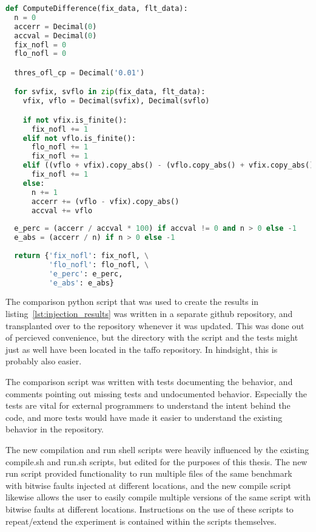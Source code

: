 \begin{lstlisting}[label=lst:validate_original,caption=Validate original,language=python]
def ComputeDifference(fix_data, flt_data):
  n = 0
  accerr = Decimal(0)
  accval = Decimal(0)
  fix_nofl = 0
  flo_nofl = 0

  thres_ofl_cp = Decimal('0.01')

  for svfix, svflo in zip(fix_data, flt_data):
    vfix, vflo = Decimal(svfix), Decimal(svflo)

    if not vfix.is_finite():
      fix_nofl += 1
    elif not vflo.is_finite():
      flo_nofl += 1
      fix_nofl += 1
    elif ((vflo + vfix).copy_abs() - (vflo.copy_abs() + vfix.copy_abs())) > thres_ofl_cp:
      fix_nofl += 1
    else:
      n += 1
      accerr += (vflo - vfix).copy_abs()
      accval += vflo
      
  e_perc = (accerr / accval * 100) if accval != 0 and n > 0 else -1
  e_abs = (accerr / n) if n > 0 else -1
      
  return {'fix_nofl': fix_nofl, \
          'flo_nofl': flo_nofl, \
          'e_perc': e_perc,
          'e_abs': e_abs}
\end{lstlisting}




The comparison python script that was used to create the results in listing~\ref{lst:injection_results} was written in a separate github repository, and transplanted over to the \taffo{} repository whenever it was updated. This was done out of percieved convenience, but the directory with the script and the tests might just as well have been located in the taffo repository. In hindsight, this is probably also easier.

The comparison script was written with tests documenting the behavior, and comments pointing out missing tests and undocumented behavior. Especially the tests are vital for external programmers to understand the intent behind the code, and more tests would have made it easier to understand the existing behavior in the \taffo{} repository. 

The new compilation and run shell scripts were heavily influenced by the existing compile.sh and run.sh scripts, but edited for the purposes of this thesis. The new run script provided functionality to run multiple files of the same benchmark with bitwise faults injected at different locations, and the new compile script likewise allows the user to easily compile multiple versions of the same script with bitwise faults at different locations. Instructions on the use of these scripts to repeat/extend the experiment is contained within the scripts themselves.


